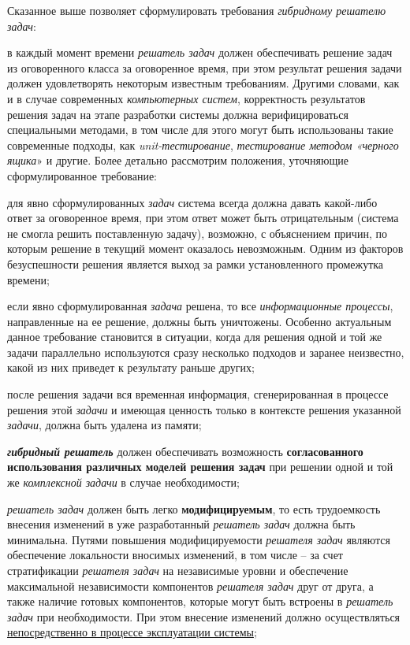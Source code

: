 Сказанное выше позволяет сформулировать требования \textit{гибридному решателю задач}:
\begin{textitemize}
	\item в каждый момент времени \textit{решатель задач} должен обеспечивать решение задач из оговоренного класса за оговоренное время, при этом результат решения задачи должен удовлетворять некоторым известным требованиям. Другими словами, как и в случае современных \textit{компьютерных систем}, корректность результатов решения задач на этапе разработки системы должна верифицироваться специальными методами, в том числе для этого могут быть использованы такие современные подходы, как \textit{unit-тестирование}, \textit{тестирование методом «черного ящика}» и другие. Более детально рассмотрим положения, уточняющие сформулированное требование:
	\begin{textitemize}
		\item для явно сформулированных \textit{задач} система всегда должна давать какой-либо ответ за оговоренное время, при этом ответ может быть отрицательным (система не смогла решить поставленную задачу), возможно, с объяснением причин, по которым решение в текущий момент оказалось невозможным. Одним из факторов безуспешности решения является выход за рамки установленного промежутка времени;
		\item если явно сформулированная \textit{задача} решена, то все \textit{информационные процессы}, направленные на ее решение, должны быть уничтожены. Особенно актуальным данное требование становится в ситуации, когда для решения одной и той же задачи параллельно используются сразу несколько подходов и заранее неизвестно, какой из них приведет к результату раньше других;
		\item после решения задачи вся временная информация, сгенерированная в процессе решения этой \textit{задачи} и имеющая ценность только в контексте решения указанной \textit{задачи}, должна быть удалена из памяти;
	\end{textitemize}
	
	\item \textit{\textbf{гибридный решатель}} должен обеспечивать возможность \textbf{согласованного использования различных моделей решения задач} при решении одной и той же \textit{комплексной задачи} в случае необходимости;
	
	\item \textit{решатель задач} должен быть легко \textbf{модифицируемым}, то есть трудоемкость внесения изменений в уже разработанный \textit{решатель задач} должна быть минимальна. Путями повышения модифицируемости \textit{решателя задач} являются обеспечение локальности вносимых изменений, в том числе -- за счет стратификации \textit{решателя задач} на независимые уровни и обеспечение максимальной независимости компонентов \textit{решателя задач} друг от друга, а также наличие готовых компонентов, которые могут быть встроены в \textit{решатель задач} при необходимости. При этом внесение изменений должно осуществляться \underline{непосредственно в процессе эксплуатации системы};
	

\end{textitemize}
